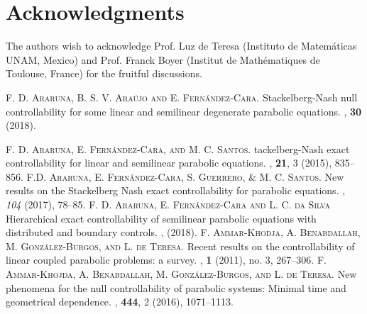 \documentclass{aims}
\theoremstyle{definition}
\begin{document}
\section*{Acknowledgments} The authors wish to acknowledge  Prof. Luz de Teresa (Instituto de Matem\'aticas UNAM, Mexico) and Prof. Franck Boyer (Institut de Math\'ematiques de Toulouse, France) for the fruitful discussions. 


\begin{thebibliography}{99}

\textsc{F. D. Araruna, B. S. V. Ara\'ujo and E. Fern\'andez-Cara.}
\newblock Stackelberg-Nash null controllability for some linear and semilinear degenerate parabolic equations. 
, \textbf{30} (2018).

\textsc{F. D. Araruna, E. Fern\'andez-Cara, and M. C. Santos.}
tackelberg-{N}ash exact controllability for linear and semilinear parabolic equations.
, \textbf{21}, 3 (2015), 835--856.
%
\textsc{F.D. Araruna, E. Fern\'andez-Cara, S. Guerrero, \& M. C.  Santos.} 
\newblock New results on the Stackelberg Nash exact controllability for parabolic equations. 
, \textit{104} (2017), 78--85. 
%
\textsc{F. D. Araruna, E. Fern\'andez-Cara and L. C. da  Silva}
\newblock Hierarchical exact controllability of semilinear parabolic equations with distributed and boundary controls.
, (2018). 
%
\textsc{F. Ammar-Khodja, A. Benabdallah, M. Gonz\'alez-Burgos, and L. de Teresa.}
\newblock Recent results on the controllability of linear coupled parabolic problems: a survey. 
, \textbf{1} (2011), no. 3, 267--306.
%
\textsc{F. Ammar-Khojda, A. Benabdallah, M. Gonz\'alez-Burgos, and L. de Teresa.}
\newblock New phenomena for the null controllability of parabolic systems: Minimal time and geometrical dependence.
, \textbf{444}, 2 (2016), 1071--1113.


\end{thebibliography}
\end{document}
